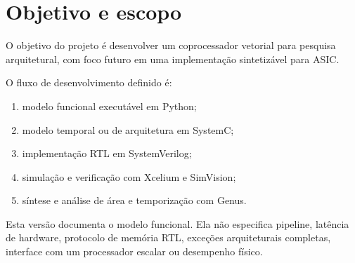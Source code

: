 \documentclass[11pt,a4paper]{article}
\begin{document}
\clearpage

\tableofcontents

\clearpage


\section{Objetivo e escopo}

O objetivo do projeto é desenvolver um coprocessador vetorial para
pesquisa arquitetural, com foco futuro em uma implementação sintetizável
para ASIC.

O fluxo de desenvolvimento definido é:

\begin{enumerate}
    \item modelo funcional executável em Python;
    \item modelo temporal ou de arquitetura em SystemC;
    \item implementação RTL em SystemVerilog;
    \item simulação e verificação com Xcelium e SimVision;
    \item síntese e análise de área e temporização com Genus.
\end{enumerate}

Esta versão documenta o modelo funcional. Ela não especifica pipeline,
latência de hardware, protocolo de memória RTL, exceções arquiteturais
completas, interface com um processador escalar ou desempenho físico.

\clearpage









% 
\end{document}
